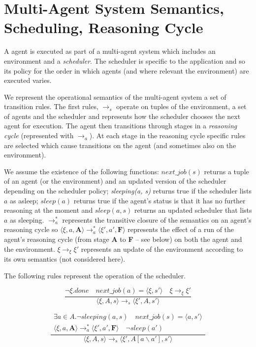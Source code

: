 \section{Multi-Agent System Semantics, Scheduling, Reasoning Cycle}

A \gwendolen agent is executed as part of a multi-agent system which includes an environment and a \emph{scheduler}.  The scheduler is specific to the application and so its policy for the order in which agents (and where relevant the environment) are executed varies.  

We represent the operational semantics of the multi-agent system a set of transition rules.  The first rules, $\rightarrow_s$ operate on tuples of the environment, a set of agents and the scheduler and represents how the scheduler chooses the next agent for execution.  The agent then transitions through stages in a \emph{reasoning cycle} (represented with $\rightarrow_a$).  At each stage in the reasoning cycle specific rules are selected which cause transitions on the agent (and sometimes also on the environment).

We assume the existence of the following functions: $next\_job(s)$ returns a tuple of an agent (or the environment) and an updated version of the scheduler depending on the scheduler policy; \emph{sleeping(a, s)} returns true if the scheduler lists $a$ as asleep; $sleep(a)$ returns true if the agent's status is that it has no further reasoning at the moment and $sleep(a, s)$ returns an updated scheduler that lists $a$ as sleeping.  $\rightarrow_a^*$ represents the transitive closure of the semantics on an agent's reasoning cycle so $\langle \xi, a, \textbf{A} \rangle \rightarrow_a^* \langle \xi', a', \textbf{F} \rangle$ represents the effect of a run of the agent's reasoning cycle (from stage \textbf{A} to \textbf{F} -- see below) on both the agent and the environment.  $\xi \rightarrow_\xi \xi'$ represents an update of the environment according to its own semantics (not considered here).

The following rules represent the operation of the scheduler.

\begin{equation}
\frac{\neg \xi.done \quad next\_job(a) = \langle \xi, s' \rangle \quad  \xi \rightarrow_{\xi} \xi'}{
\langle \xi, A, s \rangle \rightarrow_s \langle \xi', A, s' \rangle}
\end{equation}

\begin{equation}
  \frac{
    \begin{array}{c}
    \exists a \in A. \neg sleeping(a, s) \quad
    next\_job(s) = \langle a, s' \rangle \\
    \langle \xi, a, \textbf{A} \rangle \rightarrow_{a}^* \langle \xi', a', \textbf{F} \rangle \quad
    \neg sleep(a')
    \end{array}
  }{
\langle \xi, A, s \rangle \rightarrow_s \langle \xi', A[a \backslash a'], s' \rangle}
\end{equation}


